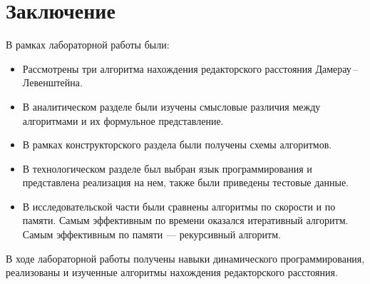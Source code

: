 \chapter*{Заключение}

В рамках лабораторной работы были:

\begin{itemize}
	\item Рассмотрены три алгоритма нахождения редакторского расстояния Дамерау\,--\,Левенштейна.
	\item В аналитическом разделе были изучены смысловые различия между алгоритмами и их формульное представление.
	\item В рамках конструкторского раздела были получены схемы алгоритмов. 
	\item В технологическом разделе был выбран язык программирования и представлена реализация на нем, также были приведены тестовые данные.
	\item В исследовательской части были сравнены алгоритмы по скорости и по памяти. Самым эффективным по времени оказался итеративный алгоритм. Самым эффективным по памяти --- рекурсивный алгоритм. 
\end{itemize}

В ходе лабораторной работы получены навыки динамического программирования, реализованы и изученные алгоритмы нахождения редакторского расстояния.